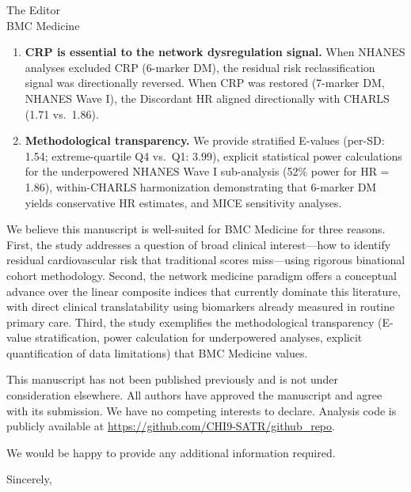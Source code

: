 \documentclass[11pt]{letter}
\begin{document}
\begin{letter}{The Editor\\
BMC Medicine}
\begin{enumerate}
\item \textbf{CRP is essential to the network dysregulation signal.} When NHANES analyses excluded CRP (6-marker DM), the residual risk reclassification signal was directionally reversed. When CRP was restored (7-marker DM, NHANES Wave I), the Discordant HR aligned directionally with CHARLS (1.71 vs.\ 1.86).

\item \textbf{Methodological transparency.} We provide stratified E-values (per-SD: 1.54; extreme-quartile Q4 vs.\ Q1: 3.99), explicit statistical power calculations for the underpowered NHANES Wave I sub-analysis (52\% power for HR = 1.86), within-CHARLS harmonization demonstrating that 6-marker DM yields conservative HR estimates, and MICE sensitivity analyses.
\end{enumerate}

We believe this manuscript is well-suited for BMC Medicine for three reasons. First, the study addresses a question of broad clinical interest---how to identify residual cardiovascular risk that traditional scores miss---using rigorous binational cohort methodology. Second, the network medicine paradigm offers a conceptual advance over the linear composite indices that currently dominate this literature, with direct clinical translatability using biomarkers already measured in routine primary care. Third, the study exemplifies the methodological transparency (E-value stratification, power calculation for underpowered analyses, explicit quantification of data limitations) that BMC Medicine values.

This manuscript has not been published previously and is not under consideration elsewhere. All authors have approved the manuscript and agree with its submission. We have no competing interests to declare. Analysis code is publicly available at \url{https://github.com/CHI9-SATR/github_repo}.

We would be happy to provide any additional information required.

\closing{Sincerely,}

\end{letter}
\end{document}

